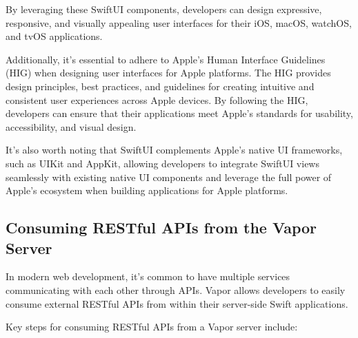 \documentclass[
  biblatex,
  language=english,
  figures=false,
  sourcecodes,
  glossaries,
  index
]{kidiplom}
\begin{document}
By leveraging these SwiftUI components, developers can design expressive, responsive, and visually appealing user interfaces for their iOS, macOS, watchOS, and tvOS applications.

Additionally, it's essential to adhere to Apple's Human Interface Guidelines (HIG) when designing user interfaces for Apple platforms. The HIG provides design principles, best practices, and guidelines for creating intuitive and consistent user experiences across Apple devices. By following the HIG, developers can ensure that their applications meet Apple's standards for usability, accessibility, and visual design.

It's also worth noting that SwiftUI complements Apple's native UI frameworks, such as UIKit and AppKit, allowing developers to integrate SwiftUI views seamlessly with existing native UI components and leverage the full power of Apple's ecosystem when building applications for Apple platforms.

\subsection{Consuming RESTful APIs from the Vapor Server}

In modern web development, it's common to have multiple services communicating with each other through APIs. Vapor allows developers to easily consume external RESTful APIs from within their server-side Swift applications.

Key steps for consuming RESTful APIs from a Vapor server include:
\end{document}
